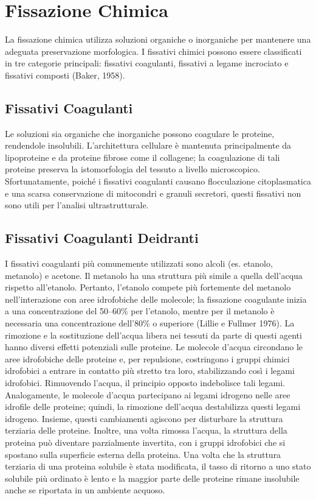 \section{Fissazione Chimica}
La fissazione chimica utilizza soluzioni organiche o inorganiche per mantenere una adeguata preservazione morfologica. I fissativi chimici possono essere classificati in tre categorie principali: fissativi coagulanti, fissativi a legame incrociato e fissativi composti (Baker, 1958).

\subsection{Fissativi Coagulanti}
Le soluzioni sia organiche che inorganiche possono coagulare le proteine, rendendole insolubili. L'architettura cellulare è mantenuta principalmente da lipoproteine e da proteine fibrose come il collagene; la coagulazione di tali proteine preserva la istomorfologia del tessuto a livello microscopico. Sfortunatamente, poiché i fissativi coagulanti causano flocculazione citoplasmatica e una scarsa conservazione di mitocondri e granuli secretori, questi fissativi non sono utili per l'analisi ultrastrutturale.

\subsection{Fissativi Coagulanti Deidranti}
I fissativi coagulanti più comunemente utilizzati sono alcoli (es. etanolo, metanolo) e acetone. Il metanolo ha una struttura più simile a quella dell'acqua rispetto all'etanolo. Pertanto, l'etanolo compete più fortemente del metanolo nell'interazione con aree idrofobiche delle molecole; la fissazione coagulante inizia a una concentrazione del 50–60\% per l'etanolo, mentre per il metanolo è necessaria una concentrazione dell'80\% o superiore (Lillie e Fullmer 1976). La rimozione e la sostituzione dell'acqua libera nei tessuti da parte di questi agenti hanno diversi effetti potenziali sulle proteine. Le molecole d'acqua circondano le aree idrofobiche delle proteine e, per repulsione, costringono i gruppi chimici idrofobici a entrare in contatto più stretto tra loro, stabilizzando così i legami idrofobici. Rimuovendo l'acqua, il principio opposto indebolisce tali legami. Analogamente, le molecole d'acqua partecipano ai legami idrogeno nelle aree idrofile delle proteine; quindi, la rimozione dell'acqua destabilizza questi legami idrogeno. Insieme, questi cambiamenti agiscono per disturbare la struttura terziaria delle proteine. Inoltre, una volta rimossa l'acqua, la struttura della proteina può diventare parzialmente invertita, con i gruppi idrofobici che si spostano sulla superficie esterna della proteina. Una volta che la struttura terziaria di una proteina solubile è stata modificata, il tasso di ritorno a uno stato solubile più ordinato è lento e la maggior parte delle proteine rimane insolubile anche se riportata in un ambiente acquoso. 

